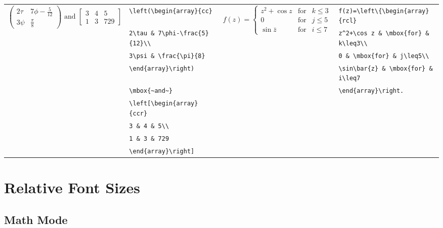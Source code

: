 \documentclass[10pt, english]{article}
\begin{document}
	\begin{center}
                \scriptsize
        \begin{tabular}{ll|ll}
		\multirow{9}{*}{$\left(\begin{array}{cc}2\tau & 7\phi-\frac{5}{12}\\3\psi & \frac{\pi}{8}\end{array}\right)\mbox{~and~}\left[\begin{array}{cc|r}3 & 4 & 5\\1 & 3 & 729\end{array}\right]$} & \verb|\left(\begin{array}{cc}| & \multirow{5}{*}{$f(z)=\left\{\begin{array}{rcl}z^2+\cos z & \mbox{for} & k\leq3\\0 & \mbox{for} & j\leq5\\\sin\bar{z} & \mbox{for} & i\leq7\end{array}\right.$} & \verb|f(z)=\left\{\begin{array}{rcl}|\\
		& \verb|2\tau & 7\phi-\frac{5}{12}\\| & & \verb|z^2+\cos z & \mbox{for} & k\leq3\\|\\
		& \verb|3\psi & \frac{\pi}{8}| & & \verb|0 & \mbox{for} & j\leq5\\|\\
		& \verb|\end{array}\right)| & & \verb|\sin\bar{z} & \mbox{for} & i\leq7|\\
		& \verb|\mbox{~and~}| & & \verb|\end{array}\right.|\\
		& \verb|\left[\begin{array}{cc|\textbar\verb|r}| \\
		& \verb|3 & 4 & 5\\| \\
		& \verb|1 & 3 & 729| \\
		& \verb|\end{array}\right]| \\
	\end{tabular}
	\end{center}

\section{Relative Font Sizes}

	\subsection{Math Mode}
\end{document}
